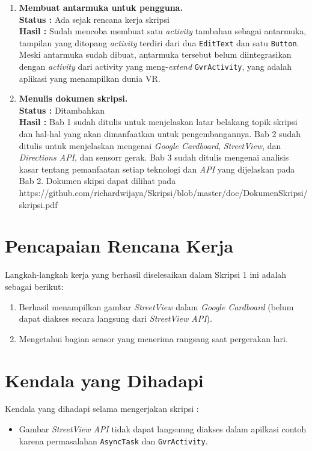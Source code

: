\documentclass[a4paper,twoside]{article}
\begin{document}
\begin{enumerate}
		\item \textbf{Membuat antarmuka untuk pengguna.}\\
		{\bf Status :} Ada sejak rencana kerja skripsi \\
		{\bf Hasil :} Sudah mencoba membuat satu \textit{activity} tambahan sebagai antarmuka, tampilan yang ditopang \textit{activity} terdiri dari dua \texttt{EditText} dan satu \texttt{Button}. Meski antarmuka sudah dibuat, antarmuka tersebut belum diintegrasikan dengan \textit{activity} dari activity yang meng-\textit{extend} \texttt{GvrActivity}, yang adalah aplikasi yang menampilkan dunia VR.
		
		\item \textbf{Menulis dokumen skripsi.}\\
		{\bf Status :} Ditambahkan \\
		{\bf Hasil :} Bab 1 sudah ditulis untuk menjelaskan latar belakang topik skripsi dan hal-hal yang akan dimanfaatkan untuk pengembangannya. Bab 2 sudah ditulis untuk menjelaskan mengenai \textit{Google Cardboard}, \textit{StreetView}, dan \textit{Directions API}, dan sensorr gerak. Bab 3 sudah ditulis mengenai analisis kasar tentang pemanfaatan setiap teknologi dan \textit{API} yang dijelaskan pada Bab 2. Dokumen skipsi dapat dilihat pada https://github.com/richardwijaya/Skripsi/blob/master/doc/DokumenSkripsi/skripsi.pdf
		
	\end{enumerate}
	

\section{Pencapaian Rencana Kerja}
Langkah-langkah kerja yang berhasil diselesaikan dalam Skripsi 1 ini adalah sebagai berikut:
\begin{enumerate}
\item Berhasil menampilkan gambar {\it StreetView} dalam {\it Google Cardboard} (belum dapat diakses secara langsung dari \textit{StreetView API}). 
\item Mengetahui bagian sensor yang menerima rangsang saat pergerakan lari.
\end{enumerate}



\section{Kendala yang Dihadapi}
Kendala yang dihadapi selama mengerjakan skripsi :
\begin{itemize}
	\item Gambar \textit{StreetView API} tidak dapat langsunng diakses dalam apilkasi contoh karena permasalahan \texttt{AsyncTask} dan \texttt{GvrActivity}.
\end{itemize}
\end{document}
